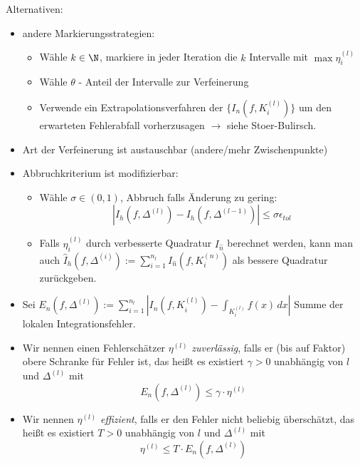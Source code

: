 \documentclass[11pt]{scrbook}
\begin{document}
\begin{note*}
	Alternativen:
	\begin{itemize}
		\item andere Markierungsstrategien:
			\begin{itemize}
				\item Wähle $k\in \N$, markiere in jeder Iteration die $k$ Intervalle mit $\max \eta_i^{(l)}$
				\item Wähle $\theta$ - Anteil der Intervalle zur Verfeinerung
				\item Verwende ein Extrapolationsverfahren der $\{I_n(f, K_i^{(l)})\}$ um den erwarteten Fehlerabfall vorherzusagen $\rightarrow$ siehe Stoer-Bulirsch.
		\end{itemize}
	\item Art der Verfeinerung ist austauschbar (andere/mehr Zwischenpunkte)
	\item Abbruchkriterium ist modifizierbar:
		\begin{itemize}
			\item Wähle $\sigma\in (0,1)$, Abbruch falls Änderung zu gering:
				\[
					|I_h(f,\Delta^{(l)})-I_{h}(f, \Delta^{(l-1)} )|\le \sigma \epsilon_{tol}
				\]
			\item Falls $\eta_i^{(l)}$ durch verbesserte Quadratur $I_{\hat n}$ berechnet werden, kann man auch $\hat I_h(f, \Delta^{(i)}):=\sum_{i=1}^{n_l} I_{\hat n} (f, K_i^{(n)})$ als bessere Quadratur zurückgeben.
		\end{itemize}
\end{itemize}
\end{note*}
\begin{note*}
	\begin{itemize}
		\item Sei $E_n(f, \Delta^{(l)}):= \sum_{i=1}^{n_l} |I_n(f,K_i^{(l)}) - \int_{K_i^{(l)}} f(x)\, dx|$ Summe der lokalen Integrationsfehler.
		\item Wir nennen einen Fehlerschätzer $\eta^{(l)}$ \emph{zuverlässig}, falls er (bis auf Faktor) obere Schranke für Fehler ist, das heißt es existiert $\gamma >0$ unabhängig von $l$ und $\Delta^{(l)}$ mit 
			\[
				E_n(f, \Delta^{(l)})\le \gamma \cdot \eta^{(l)}
			\]
		\item Wir nennen $\eta^{(l)}$ \emph{effizient}, falls er den Fehler nicht beliebig überschätzt, das heißt es existiert $T>0$ unabhängig von $l$ und $\Delta^{(l)}$ mit 
			\[
				\eta^{(l)}\le T \cdot E_n(f, \Delta^{(l)})
			\]
	\end{itemize}
\end{note*}
\end{document}
